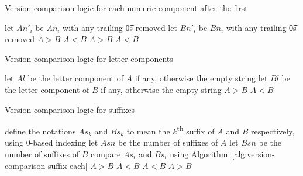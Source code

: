 \begin{algorithm}[p]
\caption{Version comparison logic for each numeric component after the first}
\label{alg:version-comparison-numeric-nonfirst}
\begin{algorithmic}[1]
    \STATE let $An'_i$ be $An_i$ with any trailing \t{0}s removed
    \STATE let $Bn'_i$ be $Bn_i$ with any trailing \t{0}s removed
      \RETURN $A>B$
      \RETURN $A<B$
    \ENDIF
  \ELSE
      \RETURN $A>B$
      \RETURN $A<B$
    \ENDIF
  \ENDIF
\end{algorithmic}
\end{algorithm}

\begin{algorithm}[p]
\caption{Version comparison logic for letter components} \label{alg:version-comparison-letter}
\begin{algorithmic}[1]
  \STATE let $Al$ be the letter component of $A$ if any, otherwise the empty string
  \STATE let $Bl$ be the letter component of $B$ if any, otherwise the empty string
    \RETURN $A>B$
    \RETURN $A<B$
  \ENDIF
\end{algorithmic}
\end{algorithm}

\begin{algorithm}[p]
\caption{Version comparison logic for suffixes} \label{alg:version-comparison-suffix}
\begin{algorithmic}[1]
  \STATE define the notations $As_k$ and $Bs_k$ to mean the $k$\textsuperscript{th} suffix of $A$
      and $B$ respectively, using $0$-based indexing
  \STATE let $Asn$ be the number of suffixes of $A$
  \STATE let $Bsn$ be the number of suffixes of $B$
    \STATE compare $As_i$ and $Bs_i$ using Algorithm~\ref{alg:version-comparison-suffix-each}
  \ENDFOR
      \RETURN $A>B$
    \ELSE
      \RETURN $A<B$
    \ENDIF
      \RETURN $A<B$
    \ELSE
      \RETURN $A>B$
    \ENDIF
  \ENDIF
\end{algorithmic}
\end{algorithm}

